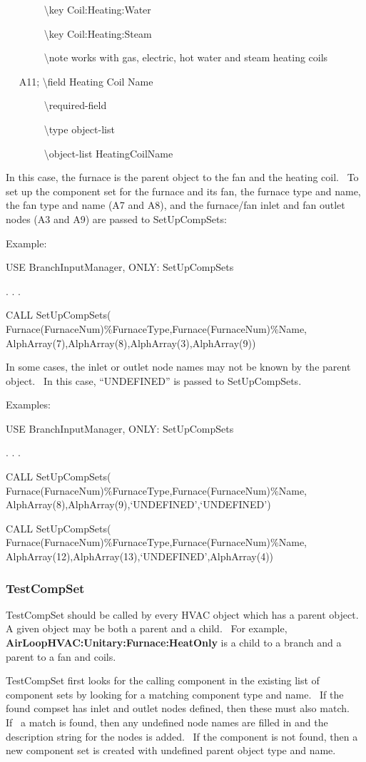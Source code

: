 ~~~~~~~ \textbackslash{}key Coil:Heating:Water

~~~~~~~ \textbackslash{}key Coil:Heating:Steam

~~~~~~~ \textbackslash{}note works with gas, electric, hot water and steam heating coils

~~ A11; \textbackslash{}field Heating Coil Name

~~~~~~~ \textbackslash{}required-field

~~~~~~~ \textbackslash{}type object-list

~~~~~~~ \textbackslash{}object-list HeatingCoilName

In this case, the furnace is the parent object to the fan and the heating coil.~ To set up the component set for the furnace and its fan, the furnace type and name, the fan type and name (A7 and A8), and the furnace/fan inlet and fan outlet nodes (A3 and A9) are passed to SetUpCompSets:

Example:

USE BranchInputManager, ONLY: SetUpCompSets

. . .

CALL SetUpCompSets( Furnace(FurnaceNum)\%FurnaceType,Furnace(FurnaceNum)\%Name, AlphArray(7),AlphArray(8),AlphArray(3),AlphArray(9))

In some cases, the inlet or outlet node names may not be known by the parent object.~ In this case, ``UNDEFINED'' is passed to SetUpCompSets.

Examples:

USE BranchInputManager, ONLY: SetUpCompSets

. . .

CALL SetUpCompSets( Furnace(FurnaceNum)\%FurnaceType,Furnace(FurnaceNum)\%Name, AlphArray(8),AlphArray(9),`UNDEFINED',`UNDEFINED')

CALL SetUpCompSets( Furnace(FurnaceNum)\%FurnaceType,Furnace(FurnaceNum)\%Name, AlphArray(12),AlphArray(13),`UNDEFINED',AlphArray(4))

\subsubsection{TestCompSet}\label{testcompset}

TestCompSet should be called by every HVAC object which has a parent object.~ A given object may be both a parent and a child.~ For example, \textbf{AirLoopHVAC:Unitary:Furnace:HeatOnly} is a child to a branch and a parent to a fan and coils.

TestCompSet first looks for the calling component in the existing list of component sets by looking for a matching component type and name.~ If the found compset has inlet and outlet nodes defined, then these must also match.~ If~ a match is found, then any undefined node names are filled in and the description string for the nodes is added.~ If the component is not found, then a new component set is created with undefined parent object type and name.

